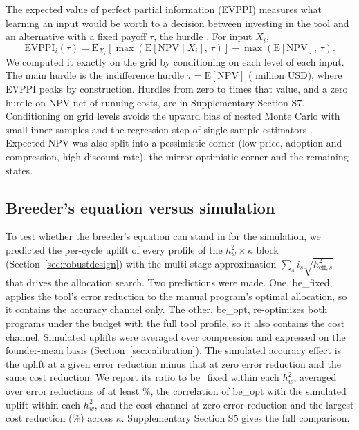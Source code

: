The expected value of perfect partial information (EVPPI) measures what learning an input would be worth to a decision between investing in the tool and an alternative with a fixed payoff $\tau$, the hurdle \citep{Claxton2001Bayesian}. For input $X_i$,
\begin{equation}
\mathrm{EVPPI}_i(\tau) = \mathrm{E}_{X_i}\!\left[\max\left(\mathrm{E}[\mathrm{NPV}\mid X_i],\,\tau\right)\right] - \max\left(\mathrm{E}[\mathrm{NPV}],\,\tau\right).
\label{eq:evppi}
\end{equation}
We computed it exactly on the grid by conditioning on each level of each input. The main hurdle is the indifference hurdle $\tau = \mathrm{E}[\mathrm{NPV}]$ (\NumEVprior{} million USD), where EVPPI peaks by construction. Hurdles from zero to \NumCfgHurdleMaxMult{} times that value, and a zero hurdle on NPV net of running costs, are in Supplementary Section S7. Conditioning on grid levels avoids the upward bias of nested Monte Carlo with small inner samples \citep{Brennan2007Calculating} and the regression step of single-sample estimators \citep{Strong2013Estimating,Heath2017Review}. Expected NPV was also split into a pessimistic corner (low price, adoption and compression, high discount rate), the mirror optimistic corner and the remaining states.

\subsection{Breeder's equation versus simulation}
\label{sec:becheck}

To test whether the breeder's equation can stand in for the simulation, we predicted the per-cycle uplift of every profile of the $h^2_w \times \kappa$ block (Section~\ref{sec:robustdesign}) with the multi-stage approximation $\sum_s i_s \sqrt{h^2_{\mathrm{eff},s}}$ that drives the allocation search. Two predictions were made. One, be\_fixed, applies the tool's error reduction to the manual program's optimal allocation, so it contains the accuracy channel only. The other, be\_opt, re-optimizes both programs under the budget with the full tool profile, so it also contains the cost channel. Simulated uplifts were averaged over compression and expressed on the founder-mean basis (Section~\ref{sec:calibration}). The simulated accuracy effect is the uplift at a given error reduction minus that at zero error reduction and the same cost reduction. We report its ratio to be\_fixed within each $h^2_w$, averaged over error reductions of at least \NumBEerrMin\%, the correlation of be\_opt with the simulated uplift within each $h^2_w$, and the cost channel at zero error reduction and the largest cost reduction (\NumBEcostRedMax\%) across $\kappa$. Supplementary Section S5 gives the full comparison.

